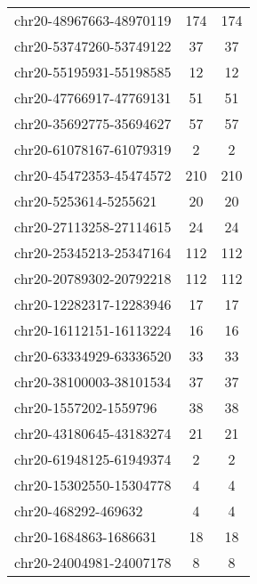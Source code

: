 \begin{longtable}{lSS}
	chr20-48967663-48970119 & 174    & 174                                       \\
	chr20-53747260-53749122 & 37     & 37                                        \\
	chr20-55195931-55198585 & 12     & 12                                        \\
	chr20-47766917-47769131 & 51     & 51                                        \\
	chr20-35692775-35694627 & 57     & 57                                        \\
	chr20-61078167-61079319 & 2      & 2                                         \\
	chr20-45472353-45474572 & 210    & 210                                       \\
	chr20-5253614-5255621   & 20     & 20                                        \\
	chr20-27113258-27114615 & 24     & 24                                        \\
	chr20-25345213-25347164 & 112    & 112                                       \\
	chr20-20789302-20792218 & 112    & 112                                       \\
	chr20-12282317-12283946 & 17     & 17                                        \\
	chr20-16112151-16113224 & 16     & 16                                        \\
	chr20-63334929-63336520 & 33     & 33                                        \\
	chr20-38100003-38101534 & 37     & 37                                        \\
	chr20-1557202-1559796   & 38     & 38                                        \\
	chr20-43180645-43183274 & 21     & 21                                        \\
	chr20-61948125-61949374 & 2      & 2                                         \\
	chr20-15302550-15304778 & 4      & 4                                         \\
	chr20-468292-469632     & 4      & 4                                         \\
	chr20-1684863-1686631   & 18     & 18                                        \\
	chr20-24004981-24007178 & 8      & 8                                         \\

\end{longtable}
